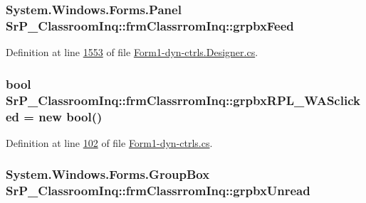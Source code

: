 \hypertarget{class_sr_p___classroom_inq_1_1frm_classrrom_inq_aef19294d5a98aeb9030537fe32d25fde}{
\subsubsection[{grpbx\-Feed}]{\setlength{\rightskip}{0pt plus 5cm}\-System.\-Windows.\-Forms.\-Panel {\bf \-Sr\-P\-\_\-\-Classroom\-Inq\-::frm\-Classrrom\-Inq\-::grpbx\-Feed}}}
\label{class_sr_p___classroom_inq_1_1frm_classrrom_inq_aef19294d5a98aeb9030537fe32d25fde}


\-Definition at line \hyperlink{_form1-dyn-ctrls_8_designer_8cs_source_l01553}{1553} of file \hyperlink{_form1-dyn-ctrls_8_designer_8cs_source}{\-Form1-\/dyn-\/ctrls.\-Designer.\-cs}.

\hypertarget{class_sr_p___classroom_inq_1_1frm_classrrom_inq_a97ab9f8512cd6b2f9648651d5c5d404b}{
\subsubsection[{grpbx\-R\-P\-L\-\_\-\-W\-A\-Sclicked}]{\setlength{\rightskip}{0pt plus 5cm}bool {\bf \-Sr\-P\-\_\-\-Classroom\-Inq\-::frm\-Classrrom\-Inq\-::grpbx\-R\-P\-L\-\_\-\-W\-A\-Sclicked} = new bool()}}
\label{class_sr_p___classroom_inq_1_1frm_classrrom_inq_a97ab9f8512cd6b2f9648651d5c5d404b}


\-Definition at line \hyperlink{_form1-dyn-ctrls_8cs_source_l00102}{102} of file \hyperlink{_form1-dyn-ctrls_8cs_source}{\-Form1-\/dyn-\/ctrls.\-cs}.

\hypertarget{class_sr_p___classroom_inq_1_1frm_classrrom_inq_a0e65b517d6f3d5bc8e159ff6283dc508}{
\subsubsection[{grpbx\-Unread}]{\setlength{\rightskip}{0pt plus 5cm}\-System.\-Windows.\-Forms.\-Group\-Box {\bf \-Sr\-P\-\_\-\-Classroom\-Inq\-::frm\-Classrrom\-Inq\-::grpbx\-Unread}}}
\label{class_sr_p___classroom_inq_1_1frm_classrrom_inq_a0e65b517d6f3d5bc8e159ff6283dc508}


